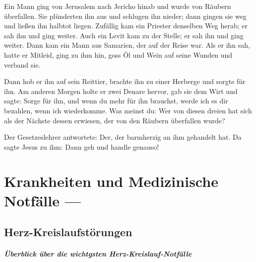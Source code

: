 \begin{savequote}
Ein Mann ging von Jerusalem nach Jericho hinab und wurde von Räubern überfallen. 
Sie plünderten ihn aus und schlugen ihn nieder; dann gingen sie weg und ließen ihn 
halbtot liegen. Zufällig kam ein Priester denselben Weg
herab; er sah ihn und ging weiter. Auch ein Levit kam zu
der  Stelle; er sah ihn und ging weiter. Dann kam ein Mann
aus  Samarien, der auf der Reise war. Als er ihn sah, hatte
er  Mitleid, ging zu ihm hin, goss Öl und Wein auf seine
Wunden  und verband sie. 

Dann hob er ihn auf sein Reittier,
brachte  ihn zu einer Herberge und sorgte für ihn. Am
anderen Morgen  holte er zwei Denare hervor, gab sie dem
Wirt und sagte:  Sorge für ihn, und wenn du mehr für ihn
brauchst, werde  ich es dir bezahlen, wenn ich wiederkomme.
Was meinst du:  Wer von diesen dreien hat sich als der
Nächste dessen erwiesen,  der von den Räubern überfallen
wurde?  

Der Gesetzeslehrer antwortete: Der, der
barmherzig an  ihm gehandelt hat. Da
sagte Jesus zu ihm: Dann geh und handle genauso!
\end{savequote}

\chapter{Krankheiten und Medizinische Notfälle --- }



\minitoc


% 
% 
% 




\cleardoublepage
\section{Herz-Kreislaufstörungen}


\label{sec:herz-kreislauf-stoerungen}
\label{topic:herz-kreislauf-stoerungen}

\paragraph{Überblick über die wichtgsten
Herz-Kreislauf-Notfälle}

